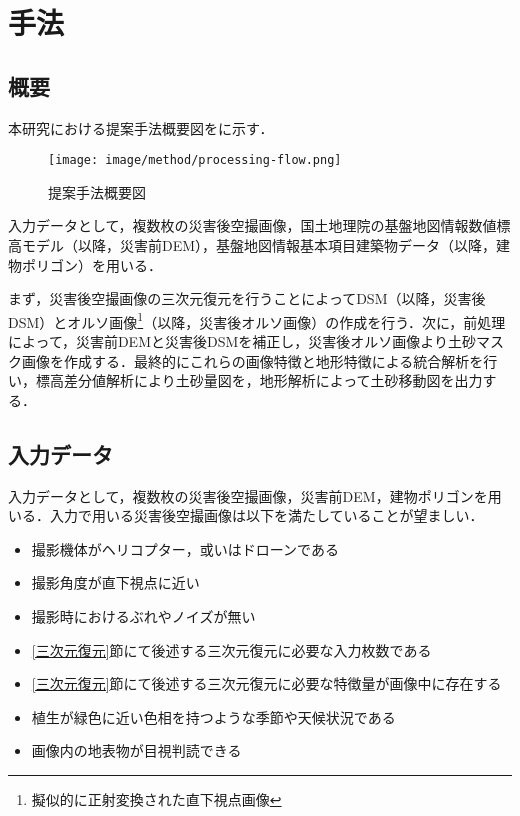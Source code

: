 \chapter{手法}
  \section{概要}
    本研究における提案手法概要図をに示す．

    \begin{figure}[tbp]
      \centering
      \texttt{[image: image/method/processing-flow.png]}
      \caption{提案手法概要図}
      \label{提案手法概要図}
    \end{figure}
    
    入力データとして，複数枚の災害後空撮画像，国土地理院の基盤地図情報数値標高モデル（以降，災害前DEM），基盤地図情報基本項目建築物データ\cite{基盤地図情報}（以降，建物ポリゴン）を用いる．

    まず，災害後空撮画像の三次元復元を行うことによってDSM（以降，災害後DSM）とオルソ画像\footnote{擬似的に正射変換された直下視点画像}（以降，災害後オルソ画像）の作成を行う．次に，前処理によって，災害前DEMと災害後DSMを補正し，災害後オルソ画像より土砂マスク画像を作成する．最終的にこれらの画像特徴と地形特徴による統合解析を行い，標高差分値解析により土砂量図を，地形解析によって土砂移動図を出力する．



  \section{入力データ}
    \label{入力データ}
    入力データとして，複数枚の災害後空撮画像，災害前DEM，建物ポリゴンを用いる．入力で用いる災害後空撮画像は以下を満たしていることが望ましい．

    \begin{itemize}
      \setlength{\itemsep}{-5pt}
      \item 撮影機体がヘリコプター，或いはドローンである
      \item 撮影角度が直下視点に近い
      \item 撮影時におけるぶれやノイズが無い
      \item \ref{三次元復元}節にて後述する三次元復元に必要な入力枚数である
      \item \ref{三次元復元}節にて後述する三次元復元に必要な特徴量が画像中に存在する
      \item 植生が緑色に近い色相を持つような季節や天候状況である
      \item 画像内の地表物が目視判読できる
    \end{itemize}

